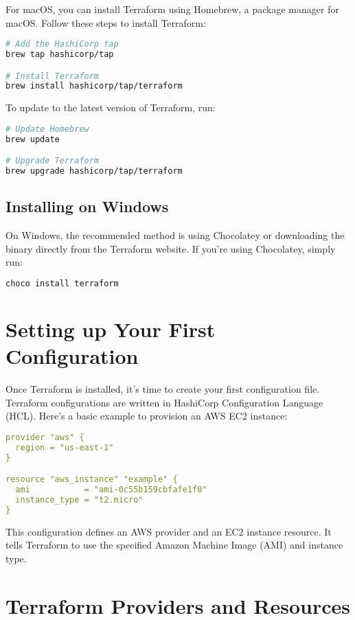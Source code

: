 For macOS, you can install Terraform using Homebrew, a package manager for macOS. Follow these steps to install Terraform:

\begin{lstlisting}[language=bash]
# Add the HashiCorp tap
brew tap hashicorp/tap

# Install Terraform
brew install hashicorp/tap/terraform
\end{lstlisting}

To update to the latest version of Terraform, run:

\begin{lstlisting}[language=bash]
# Update Homebrew
brew update

# Upgrade Terraform
brew upgrade hashicorp/tap/terraform
\end{lstlisting}

\subsection{Installing on Windows}

On Windows, the recommended method is using Chocolatey or downloading the binary directly from the Terraform website. If you're using Chocolatey, simply run:

\begin{lstlisting}[language=bash]
choco install terraform
\end{lstlisting}

\section{Setting up Your First Configuration}

Once Terraform is installed, it's time to create your first configuration file. Terraform configurations are written in HashiCorp Configuration Language (HCL). Here's a basic example to provision an AWS EC2 instance:

\begin{lstlisting}[language=yaml]
provider "aws" {
  region = "us-east-1"
}

resource "aws_instance" "example" {
  ami           = "ami-0c55b159cbfafe1f0"
  instance_type = "t2.micro"
}
\end{lstlisting}

This configuration defines an AWS provider and an EC2 instance resource. It tells Terraform to use the specified Amazon Machine Image (AMI) and instance type.

\section{Terraform Providers and Resources}

